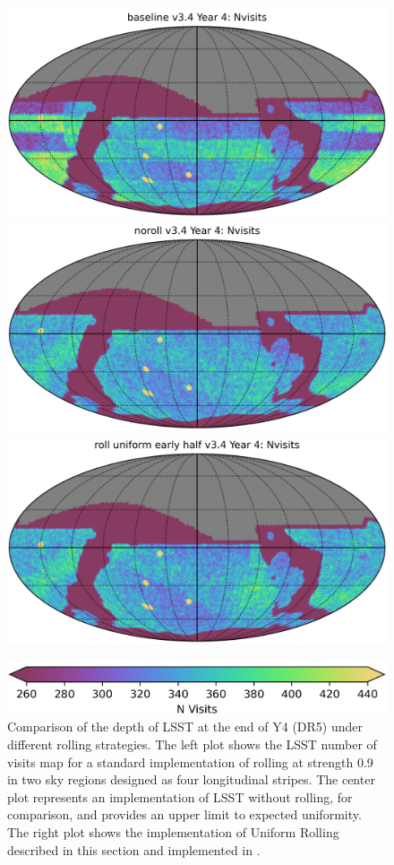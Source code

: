 \begin{figure}
    \centering
    \includegraphics[width=0.32\linewidth]{figures/baseline_v3_4_Nvisits_Year_4_HEAL_SkyMap.png}
    \includegraphics[width=0.32\linewidth]{figures/noroll_v3_4_Nvisits_Year_4_HEAL_SkyMap.png}
    \includegraphics[width=0.32\linewidth]{figures/roll_uniform_early_half_v3_4_Nvisits_Year_4_HEAL_SkyMap.png}

    \includegraphics[width=0.6\linewidth]{figures/roll_colorbar.png}
    \caption{Comparison of the depth of LSST at the end of Y4 (DR5) under different rolling strategies. The left plot shows the LSST number of visits map for a standard implementation of rolling at strength 0.9 in two sky regions designed as four longitudinal stripes. The center plot represents an implementation of LSST without rolling, for comparison, and provides an upper limit to expected uniformity. The right plot shows the implementation of Uniform Rolling described in this section and implemented in .}
    \label{fig:uniform-rolling}
\end{figure}

